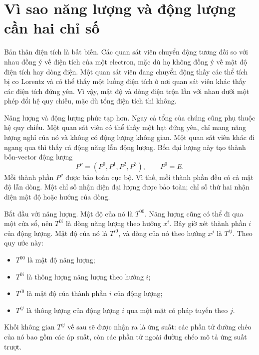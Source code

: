 \section{Vì sao năng lượng và động lượng cần hai chỉ số}

Bản thân điện tích là bất biến. Các quan sát viên chuyển động tương đối so với nhau đồng ý về điện tích của một electron, mặc dù họ không đồng ý về mật độ điện tích hay dòng điện. Một quan sát viên đang chuyển động thấy các thể tích bị co Lorentz và có thể thấy một luồng điện tích ở nơi quan sát viên khác thấy các điện tích đứng yên. Vì vậy, mật độ và dòng điện trộn lẫn với nhau dưới một phép đổi hệ quy chiếu, mặc dù tổng điện tích thì không.

Năng lượng và động lượng phức tạp hơn. Ngay cả tổng của chúng cũng phụ thuộc hệ quy chiếu. Một quan sát viên có thể thấy một hạt đứng yên, chỉ mang năng lượng nghỉ của nó và không có động lượng không gian. Một quan sát viên khác đi ngang qua thì thấy cả động năng lẫn động lượng. Bốn đại lượng này tạo thành bốn-vector động lượng
\begin{equation}
 P^\nu=(P^0,P^1,P^2,P^3),
 \qquad P^0=E.
\end{equation}
Mỗi thành phần \(P^\nu\) được bảo toàn cục bộ. Vì thế, mỗi thành phần đều có cả mật độ lẫn dòng. Một chỉ số nhận diện đại lượng được bảo toàn; chỉ số thứ hai nhận diện mật độ hoặc hướng của dòng.

Bắt đầu với năng lượng. Mật độ của nó là \(T^{00}\). Năng lượng cũng có thể đi qua một cửa sổ, nên \(T^{0i}\) là dòng năng lượng theo hướng \(x^i\). Bây giờ xét thành phần \(i\) của động lượng. Mật độ của nó là \(T^{i0}\), và dòng của nó theo hướng \(x^j\) là \(T^{ij}\). Theo quy ước này:
\begin{itemize}
 \item \(T^{00}\) là mật độ năng lượng;
 \item \(T^{0i}\) là thông lượng năng lượng theo hướng \(i\);
 \item \(T^{i0}\) là mật độ của thành phần \(i\) của động lượng;
 \item \(T^{ij}\) là thông lượng của động lượng \(i\) qua một mặt có pháp tuyến theo \(j\).
\end{itemize}
Khối không gian \(T^{ij}\) về sau sẽ được nhận ra là ứng suất: các phần tử đường chéo của nó bao gồm các áp suất, còn các phần tử ngoài đường chéo mô tả ứng suất trượt.

\begin{classroomqa}
\end{classroomqa}

